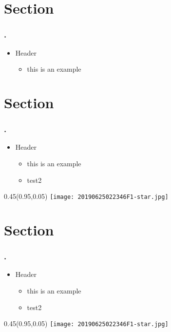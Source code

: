 \documentclass[12pt,t]{beamer}
\newcommand{\pagemark}
{
\begin{textblock*}{0.45\textwidth}(0.95\textwidth,0.05\textheight)
\texttt{[image: 20190625022346F1-star.jpg]}
\end{textblock*}
}
\begin{document}
\section{Section}
\begin{frame}
\frametitle{\thesection.~\insertsection}
\begin{itemize}
\item Header
\begin{itemize}
\item this is an example
\end{itemize}
\end{itemize}
\end{frame}


\section{Section}
\begin{frame}
\frametitle{\thesection.~\insertsection}
\begin{itemize}
\item Header
\begin{itemize}
\item this is an example

\item test2
\end{itemize}
\end{itemize}
\pagemark
\end{frame}



\section{Section}
\begin{frame}
\frametitle{\thesection.~\insertsection}
\begin{itemize}
\item Header
\begin{itemize}
\item this is an example
\item test2

\end{itemize}
\end{itemize}
\pagemark
\end{frame}
\end{document}
